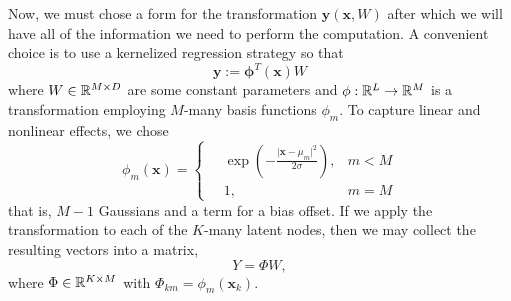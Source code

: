 Now, we must chose a form for the transformation $\mathbf{y}(\mathbf{x},W)$ after which we will have all of the information we need to perform the computation. A convenient choice is to use a kernelized regression strategy so that
\begin{equation}
  \mathbf{y} := \mathbf{\phi}^T(\mathbf{x})W
\end{equation}
where $W\in\mathbb{R}^{M\times D}$ are some constant parameters and $\mathbf{\phi}:\mathbb{R}^L\to\mathbb{R}^M$ is a transformation employing $M$-many basis functions $\phi_m$. To capture linear and nonlinear effects, we chose
\begin{equation}
  \phi_m(\mathbf{x}) = \begin{cases}
    \quad \exp(-\frac{\lvert \mathbf{x}-\mu_m\rvert^2}{2\sigma}), & m < M \\
    \quad 1, & m = M
  \end{cases}
\end{equation}
that is, $M-1$ Gaussians and a term for a bias offset. If we apply the transformation to each of the $K$-many latent nodes, then we may collect the resulting vectors into a matrix,
\begin{equation}
  Y = \Phi W,
\end{equation}
where $\Phi\in\mathbb{R}^{K\times M}$ with $\Phi_{km}=\phi_m(\mathbf{x}_k)$.

